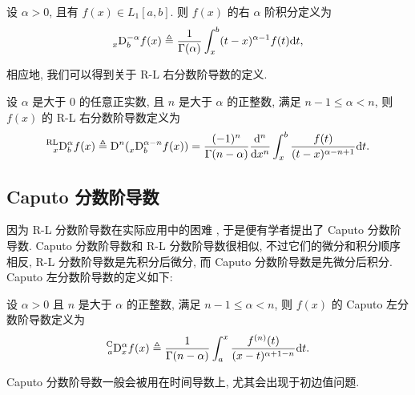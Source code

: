 \documentclass{ecnumaster}
\begin{document}
\begin{definition}[右分数阶积分]
  设 $\alpha > 0$, 且有 $f(x) \in L_1[a, b].$ 则 $f(x)$ 的右 $\alpha$ 阶积分定义为
  \begin{equation}\nonumber
    \prescript{}{x}{\mathrm{D}}_b^{-\alpha} f(x) \triangleq \frac{1}{\Gamma (\alpha)} \int _x^b (t-x)^{\alpha - 1}f(t)\mathrm{{\mathrm{d}}}t,
  \end{equation}
\end{definition}
%
相应地, 我们可以得到关于 R-L 右分数阶导数的定义.
\begin{definition} 
  设 $\alpha$ 是大于 0 的任意正实数, 且 $n$ 是大于 $\alpha$ 的正整数,
  满足 $n - 1 \le \alpha < n$,
  则 $f(x)$ 的 R-L 右分数阶导数定义为
$$
\prescript{\mathrm{RL}}{x}{\mathrm{D}}_b^{\alpha} f(x) \triangleq {\mathrm{D}}^n(\prescript{}{x}{\mathrm{D}}_b^{\alpha-n}f(x)) = \frac{(-1)^n}{\Gamma (n-\alpha)}
\frac{\mathrm{d}^n}{\mathrm{d}x^n} \int _x^b \frac{f(t)}{(t-x)^{\alpha -n+1}} \mathrm{d}t.
$$
\end{definition}



\subsection{Caputo 分数阶导数}
因为 R-L 分数阶导数在实际应用中的困难 \cite{D10},
于是便有学者提出了 Caputo 分数阶导数\cite{C67, C69}.
Caputo 分数阶导数和 R-L 分数阶导数很相似, 不过它们的微分和积分顺序相反,
R-L 分数阶导数是先积分后微分, 而 Caputo 分数阶导数是先微分后积分.
Caputo 左分数阶导数的定义如下:
\begin{definition}
  设 $\alpha > 0$ 且 $n$ 是大于 $\alpha$ 的正整数,
  满足 $n - 1 \le \alpha < n$,
  则 $f(x)$ 的 Caputo 左分数阶导数定义为
  $$
    \prescript{\mathrm{C}}{a}{\mathrm{D}}_x^{\alpha} f(x)
    \triangleq \frac{1}{\Gamma (n-\alpha)} \int _a^{x}
    \frac{f^{(n)}(t)}{(x-t)^{\alpha + 1 - n}} \mathrm{d}t.
  $$
\end{definition}
Caputo 分数阶导数一般会被用在时间导数上, 尤其会出现于初边值问题.
\end{document}
